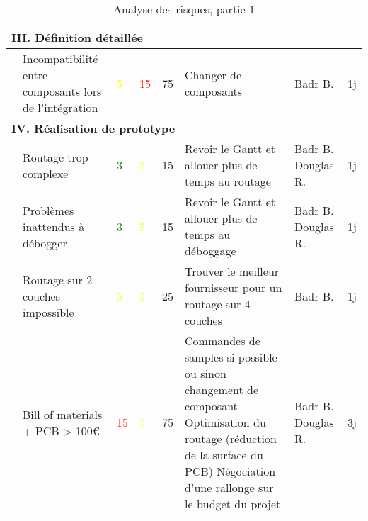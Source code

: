 \begin{sidewaystable}[H]
\begin{tabularx}{\textwidth}{|p{1cm}|X|p{0.5cm}|p{0.5cm}|p{0.5cm}|X|p{2cm}|p{1cm}|}
    \multicolumn{8}{|l|}{\textbf{III. Définition détaillée}} \\ \hline
          & Incompatibilité entre composants
lors de l'intégration & \textcolor{yellow}{5}     & \textcolor{red}{15}    & 75      & Changer de composants & Badr B. & 1j \\ \hline

    \multicolumn{8}{|l|}{\textbf{IV. Réalisation de prototype}} \\ \hline
          & Routage trop complexe & \textcolor{green}{3}     & \textcolor{yellow}{5}     & 15      & Revoir le Gantt et allouer plus de temps au routage & Badr B.
Douglas R. & 1j \\ \hline
          & Problèmes inattendus à débogger & \textcolor{green}{3}     & \textcolor{yellow}{5}     & 15      & Revoir le Gantt et allouer plus de temps au déboggage & Badr B.
Douglas R. & 1j \\ \hline
          & Routage sur 2 couches impossible & \textcolor{yellow}{5}     & \textcolor{yellow}{5}     & 25      & Trouver le meilleur fournisseur pour un routage sur 4 couches & Badr B. & 1j \\ \hline
          & Bill of materials + PCB > 100€ & \textcolor{red}{15}    & \textcolor{yellow}{5}     & 75      & Commandes de samples si possible ou sinon changement de composant
Optimisation du routage (réduction de la surface du PCB)
Négociation d'une rallonge sur le budget du projet & Badr B.
Douglas R. & 3j \\ \hline
    \end{tabularx}%
  \endgroup{}
  \caption{Analyse des risques, partie 1}    
\end{sidewaystable}%


